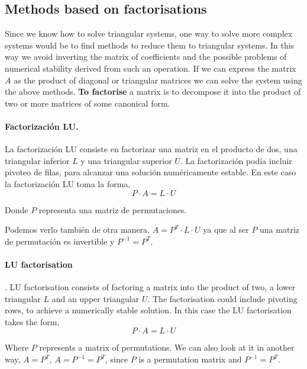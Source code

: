 \begin{paracol}{2}
\switchcolumn
\subsection{Methods based on factorisations}

Since we know how to solve triangular systems, one way to solve more complex systems would be to find methods to reduce them to triangular systems. In this way we avoid inverting the matrix of coefficients and the possible problems of numerical stability derived from such an operation. If we can express the matrix $A$ as the product of diagonal or triangular matrices we can solve the system using the above methods. \textbf{To factorise} a matrix is to decompose it into the product of two or more matrices of some canonical form.

\switchcolumn
\paragraph{Factorización LU.} La factorización LU consiste en factorizar una matriz en el producto de dos, una triangular inferior $L$ y una triangular superior $U$. La factorización podía incluir pivoteo de filas, para alcanzar una solución numéricamente estable. En este caso la factorización LU toma la forma,
\begin{equation*}
P\cdot A = L\cdot U
\end{equation*}

Donde $P$ representa una matriz de permutaciones.

Podemos verlo también de otra manera, $A=P^T\cdot L \cdot U$ ya que al ser $P$ una matriz de permutación es invertible y $P^{-1}=P^T$.

\switchcolumn

\paragraph{LU factorisation}. LU factorisation consists of factoring a matrix into the product of two, a lower triangular $L$ and an upper triangular $U$. The factorisation could include pivoting rows, to achieve a numerically stable solution. In this case the LU factorisation takes the form,
\begin{equation*}
P\cdot A = L\cdot U
\end{equation*}

Where $P$ represents a matrix of permutations.
We can also look at it in another way, $A=P^T$, $A=P^{-1}=P^T$, since $P$ is a permutation matrix and $P^{-1}=P^T$.


\end{paracol}
